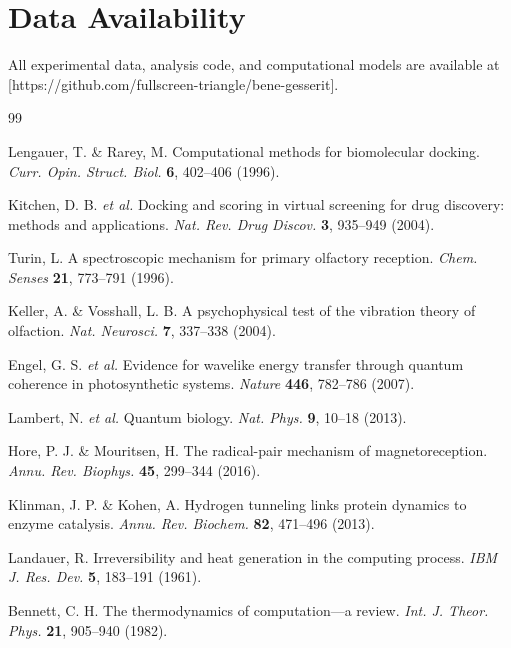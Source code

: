 \documentclass{article}
\theoremstyle{definition}
\theoremstyle{remark}
\begin{document}
\section*{Data Availability}

All experimental data, analysis code, and computational models are available at [https://github.com/fullscreen-triangle/bene-gesserit].



\begin{thebibliography}{99}

Lengauer, T. \& Rarey, M.
\newblock Computational methods for biomolecular docking.
\newblock \emph{Curr. Opin. Struct. Biol.} \textbf{6}, 402--406 (1996).

Kitchen, D. B. \emph{et al.}
\newblock Docking and scoring in virtual screening for drug discovery: methods and applications.
\newblock \emph{Nat. Rev. Drug Discov.} \textbf{3}, 935--949 (2004).

Turin, L.
\newblock A spectroscopic mechanism for primary olfactory reception.
\newblock \emph{Chem. Senses} \textbf{21}, 773--791 (1996).

Keller, A. \& Vosshall, L. B.
\newblock A psychophysical test of the vibration theory of olfaction.
\newblock \emph{Nat. Neurosci.} \textbf{7}, 337--338 (2004).

Engel, G. S. \emph{et al.}
\newblock Evidence for wavelike energy transfer through quantum coherence in photosynthetic systems.
\newblock \emph{Nature} \textbf{446}, 782--786 (2007).

Lambert, N. \emph{et al.}
\newblock Quantum biology.
\newblock \emph{Nat. Phys.} \textbf{9}, 10--18 (2013).

Hore, P. J. \& Mouritsen, H.
\newblock The radical-pair mechanism of magnetoreception.
\newblock \emph{Annu. Rev. Biophys.} \textbf{45}, 299--344 (2016).

Klinman, J. P. \& Kohen, A.
\newblock Hydrogen tunneling links protein dynamics to enzyme catalysis.
\newblock \emph{Annu. Rev. Biochem.} \textbf{82}, 471--496 (2013).

Landauer, R.
\newblock Irreversibility and heat generation in the computing process.
\newblock \emph{IBM J. Res. Dev.} \textbf{5}, 183--191 (1961).

Bennett, C. H.
\newblock The thermodynamics of computation—a review.
\newblock \emph{Int. J. Theor. Phys.} \textbf{21}, 905--940 (1982).


\end{thebibliography}
\end{document}
